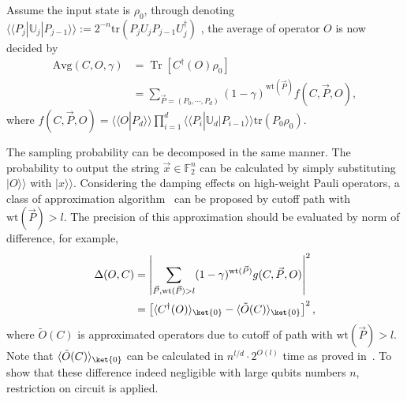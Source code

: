 \documentclass[aps,%
twocolumn,%
floatfix,%
pra,%
amsfonts,%
longbibliography,%
groupedaddress,%
superscriptaddress]{revtex4-2}%
\DeclareMathOperator{\tr}{Tr}
\newcommand{\1}{\mathbbm{1}}
\begin{document}
Assume the input state is $\rho_0$, through denoting $\langle\!\langle P_j| \mathbb{U}_j|P_{j - 1}\rangle\!\rangle := 2^{-n}\text{tr}(P_j U_j P_{j - 1}U_j^\dagger)$ , the average of operator $O$  is now decided by
\begin{align}
    \text{Avg}(C,O,\gamma)&=\tr[C^\dagger(O)\rho_0] \\
    &=\sum_{\vec P = (P_0,\cdots,P_d)}\!\!\! (1 - \gamma)^{\text{wt}(\vec P)} f(C,\vec P,O) ,
\end{align}
where $f(C,\vec P,O) =\langle\!\langle O|P_{d}\rangle\!\rangle \prod_{i = 1}^d \langle\!\langle P_i| \mathbb{U}_d|P_{i - 1}\rangle\!\rangle  \text{tr}(P_0 \rho_0)$. 

The sampling probability can be decomposed in the same manner.  The probability to output the string $\vec x \in \mathbb{F}_2^n$ can be calculated by simply substituting $|O\rangle\!\rangle$ with $|x\rangle\!\rangle$. Considering the damping effects on high-weight Pauli operators, a class of approximation algorithm~\cite{aharonov2023polynomial,schuster2024polynomial} can be proposed by cutoff path with $\text{wt}(\vec P) > l$. 
The precision of this approximation should be evaluated by norm of difference, for example,
\begin{align}
    \Delta(O,C) &=\left|\sum_{\vec P, \text{wt}(\vec P)>l} (1 - \gamma)^{\text{wt}(\vec P)} g(C,\vec P,O) \right|^2\\
    &=\left[\langle C^\dagger (O) \rangle_{\ket{0}} -  \langle \tilde O(C)\rangle_{\ket{0}}\right]^2,
\end{align}
where $\tilde O(C)$ is approximated operators due to cutoff of path with $\text{wt}(\vec P) > l$. 
Note that $\langle \tilde O(C)\rangle_{\ket{0}}$ can be calculated in $n^{l/d} \cdot 2^{O(l)}$ time as proved in~\cite{aharonov2023polynomial}.
To show that these difference indeed negligible with large qubits numbers $n$, restriction on circuit is applied. 
\end{document}
